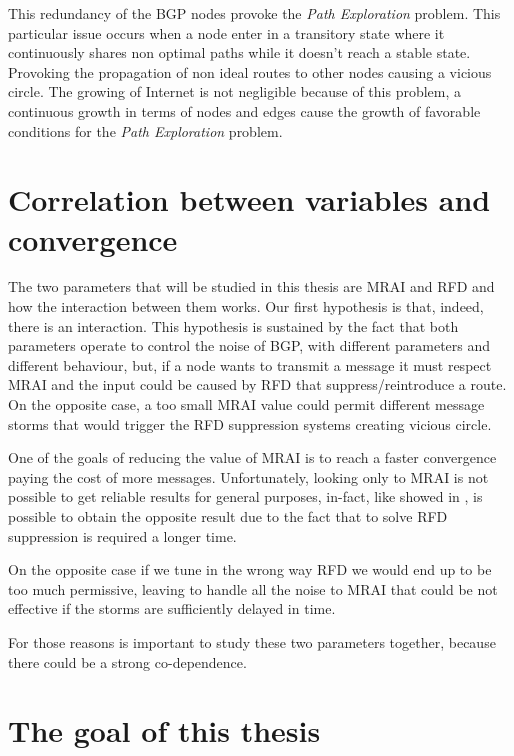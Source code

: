 This redundancy of the \ac{BGP} nodes provoke the \textit{Path Exploration}
problem.
This particular issue occurs when a node enter in a transitory state where it
continuously shares non optimal paths while it doesn't reach a stable state.
Provoking the propagation of non ideal routes to other nodes causing a vicious
circle.
The growing of Internet is not negligible because of this problem, a continuous
growth in terms of nodes and edges cause the growth of favorable conditions for
the \textit{Path Exploration} problem.

\section{Correlation between variables and convergence}
\label{sec:bgp_correlations}

The two parameters that will be studied in this thesis are \ac{MRAI} and \ac{RFD}
and how the interaction between them works.
Our first hypothesis is that, indeed, there is an interaction.
This hypothesis is sustained by the fact that both parameters operate to
control the noise of \ac{BGP}, with different parameters and different behaviour,
but, if a node wants to transmit a message it must respect \ac{MRAI} and the input
could be caused by \ac{RFD} that suppress/reintroduce a route.
On the opposite case, a too small \ac{MRAI} value could permit different message
storms that would trigger the \ac{RFD} suppression systems creating vicious circle.

One of the goals of reducing the value of \ac{MRAI} is to reach a faster convergence
paying the cost of more messages.
Unfortunately, looking only to \ac{MRAI} is not possible to get reliable results
for general purposes, in-fact, like showed in , is possible
to obtain the opposite result due to the fact that to solve \ac{RFD} suppression
is required a longer time.

On the opposite case if we tune in the wrong way \ac{RFD} we would end up to
be too much permissive, leaving to handle all the noise to \ac{MRAI} that could
be not effective if the storms are sufficiently delayed in time.

For those reasons is important to study these two parameters together, because
there could be a strong co-dependence.

\section{The goal of this thesis}
\label{sec:thesis_goal}

